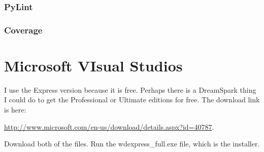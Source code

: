 \documentclass{article}
\newcommand{\web}[2]{
	\begin{center}
		\url{#1}{#2}
	\end{center}
}
\begin{document}
\subsubsection{PyLint}

\subsubsection{Coverage}

\section{Microsoft VIsual Studios}

I use the Express version because it is free.
Perhaps there is a DreamSpark thing I could do to get the Professional or Ultimate editions for free.
The download link is here:
	\web{http://www.microsoft.com/en-us/download/details.aspx?id=40787}.
Download both of the files.
Run the wdexpress\_full.exe file, which is the installer.
\end{document}
